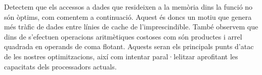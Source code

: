 
Detectem que els accessos a dades que resideixen a la memòria dins la funció  no són òptims, com comentem a continuació. Aquest és doncs un motiu que genera més tràfic de dades entre línies de cache de l'imprescindible. També observem que dins de  s'efectuen operacions aritmètiques costoses com són productes i arrel quadrada en operands de coma flotant. Aquests seran els principals punts d'atac de les nostres optimitzacions, així com intentar paral·lelitzar aprofitant les capacitats dels processadors actuals.






